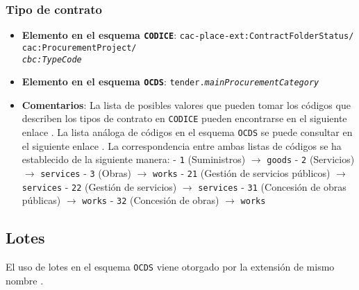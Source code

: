         \subsubsection{Tipo de contrato}
            \begin{itemize}
                \item \textbf{Elemento en el esquema \texttt{CODICE}}:
                    \tabto{7.6cm} \texttt{cac-place-ext:ContractFolderStatus/} \\
                    \tabto{7.6cm} \texttt{cac:ProcurementProject/} \\
                    \tabto{7.6cm} \texttt{\textit{cbc:TypeCode}}
                \item \textbf{Elemento en el esquema \texttt{OCDS}}:
                    \tabto{7.6cm} \texttt{tender.\textit{mainProcurementCategory}}
                \item \textbf{Comentarios}: La lista de posibles valores que pueden tomar los códigos que describen los tipos de contrato en \texttt{CODICE} pueden encontrarse en el siguiente enlace \cite{CR3}. La lista análoga de códigos en el esquema \texttt{OCDS} se puede consultar en el siguiente enlace \cite{CR4}. La correspondencia entre ambas listas de códigos se ha establecido de la siguiente manera:
                        \subitem - \texttt{1} (Suministros) $\rightarrow$ \texttt{goods}
                        \subitem - \texttt{2} (Servicios) $\rightarrow$ \texttt{services}
                        \subitem - \texttt{3} (Obras) $\rightarrow$ \texttt{works}
                        \subitem - \texttt{21} (Gestión de servicios públicos) $\rightarrow$ \texttt{services}
                        \subitem - \texttt{22} (Gestión de servicios) $\rightarrow$ \texttt{services}
                        \subitem - \texttt{31} (Concesión de obras públicas) $\rightarrow$ \texttt{works}
                        \subitem - \texttt{32} (Concesión de obras) $\rightarrow$ \texttt{works}
            \end{itemize}

    \vspace{0.3cm}
    
    \subsection{Lotes}
        
        El uso de lotes en el esquema \texttt{OCDS} viene otorgado por la extensión de mismo nombre \cite{CR6}.
    
